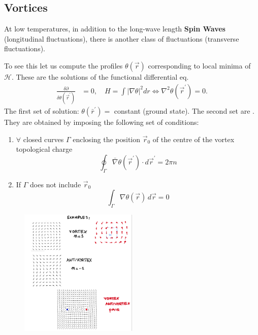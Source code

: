 \documentclass[../../Main/Main.tex]{subfiles}
\begin{document}
\subsection{Vortices}

At low temperatures, in addition to the long-wave length \textbf{Spin Waves} (longitudinal fluctuations), there is another class of fluctuations (transverse fluctuations).

To see this let us compute the profiles $\theta(\vec{r})$ corresponding to local minima of $\mathcal{H}$. These are the solutions of the functional differential eq.
$$\begin{aligned}
\frac{\delta \partial}{\delta \theta\left(\vec{r}^{\prime}\right)} & =0, \quad H=\int|\nabla \theta|^2 d r   \Leftrightarrow \nabla^2 \theta\left(\vec{r}^{\prime}\right)=0 .
\end{aligned}$$
The first set of solution: $\theta\left(\bar{r}^{\prime}\right)=$ constant (ground state).
The second set are . They are obtained by imposing the following set of conditions:

\begin{enumerate}[label=(\alph*)]
    \item $\forall$ closed curves $\Gamma$ enclosing the position $\vec{r}_0$ of the centre of the vortex topological charge $$\oint_{\Gamma} \bar{\nabla} \theta\left(\vec{r}^{\prime}\right) \cdot d \vec{r}^{\prime}=2 \pi n$$
    \item If $\Gamma$ does not include $\vec{r}_{0}$ $$\int _{\Gamma}\nabla \theta(\vec{r}) \, d\vec{r} = 0$$
\end{enumerate}

\begin{figure}[H]
\centering
\includegraphics[width=0.5\textwidth]{./img/IMG2.png}
\end{figure}
\end{document}
